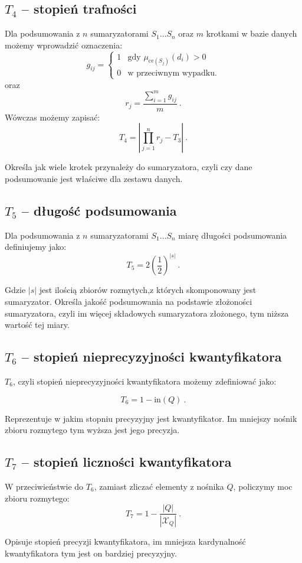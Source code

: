 \documentclass{classrep}
\begin{document}
\subsection{\(T_4\) -- stopień trafności}
Dla podsumowania z \(n\) sumaryzatorami \(S_1 \ldots S_n\)
oraz \(m\) krotkami w bazie danych możemy wprowadzić oznaczenia:
\[g_{ij} = \begin{cases}
1 & \mbox{gdy } \mu_{\mathrm{ce}(S_j)}(d_i) > 0 \\
0 & \mbox{w przeciwnym wypadku.}
\end{cases}\]
oraz
\[r_j = \frac{\sum_{i=1}^{m} g_{ij}}{m} ~\mbox{.}\]
Wówczas możemy zapisać:
\[T_4 = \left| \prod_{j=1}^{n} r_j - T_3\right| ~\mbox{.}\]

 Określa jak wiele krotek przynależy do sumaryzatora, czyli czy dane podsumowanie jest właściwe dla zestawu danych.

\subsection{\(T_5\) -- długość podsumowania}
Dla podsumowania z \(n\) sumaryzatorami \(S_1 \ldots S_n\)
miarę długości podsumowania definiujemy jako:
\[T_5 =  2 \left(\frac{1}{2}\right)^{|s|} ~\mbox{.}\]

Gdzie \(|s|\) jest ilością zbiorów rozmytych,z  których skomponowany jest sumaryzator. Określa jakość podsumowania na podstawie złożoności sumaryzatora, czyli im więcej składowych sumaryzatora złożonego, tym niższa wartość tej miary.

\subsection{\(T_6\) -- stopień nieprecyzyjności kwantyfikatora}
\(T_6\), czyli stopień nieprecyzyjności kwantyfikatora możemy zdefiniować jako:

\[T_6 = 1-\mathrm{in}(Q) ~\mbox{.}\]

Reprezentuje w jakim stopniu precyzyjny jest kwantyfikator. Im mniejszy nośnik zbioru rozmytego tym wyższa jest jego precyzja.

\subsection{\(T_7\) -- stopień liczności kwantyfikatora}
W przeciwieństwie do \(T_6\), zamiast zliczać elementy z nośnika \(Q\),
policzymy moc zbioru rozmytego:
\[T_7 = 1-\frac{|Q|}{|\mathcal{X}_Q|} ~\mbox{.}\]

Opisuje stopień precyzji kwantyfikatora, im mniejsza kardynalność kwantyfikatora tym jest on bardziej precyzyjny.
\end{document}
